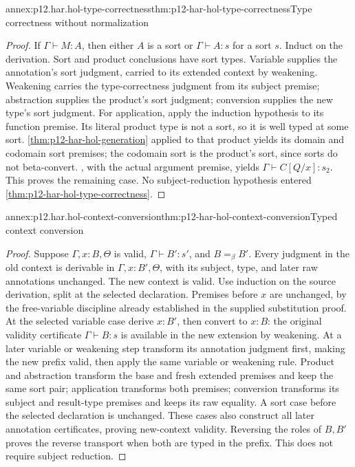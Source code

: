\begin{annexitem}{annex:p12.har.hol-type-correctness}{thm:p12-har-hol-type-correctness}{Type correctness without normalization}
\begin{proof}
If \(\Gamma\vdash M:A\), then either \(A\) is a sort or
\(\Gamma\vdash A:s\) for a sort \(s\).
Induct on the derivation. Sort and product conclusions have sort types.
Variable supplies the annotation's sort judgment, carried to its
extended context by weakening. Weakening carries the type-correctness
judgment from its subject premise; abstraction supplies the product's
sort judgment; conversion supplies the new type's sort judgment.
For application, apply the induction hypothesis to its function premise.
Its literal product type is not a sort, so it is well typed at some sort.
\cref{thm:p12-har-hol-generation} applied to that product yields its domain and codomain sort premises;
the codomain sort is the product's sort, since sorts do not beta-convert.
, with the actual argument
premise, yields \(\Gamma\vdash C[Q/x]:s_2\). This proves the remaining
case. No subject-reduction hypothesis entered \cref{thm:p12-har-hol-type-correctness}.
\end{proof}
\end{annexitem}

\begin{annexitem}{annex:p12.har.hol-context-conversion}{thm:p12-har-hol-context-conversion}{Typed context conversion}
\begin{proof}
Suppose \(\Gamma,x:B,\Theta\) is valid,
\(\Gamma\vdash B':s'\), and \(B=_\beta B'\).
Every judgment in the old context is derivable in
\(\Gamma,x:B',\Theta\), with its subject, type, and later raw
annotations unchanged. The new context is valid.
Use induction on the source derivation, split at the selected declaration.
Premises before \(x\) are unchanged, by the free-variable discipline
already established in the supplied substitution proof. At the selected
variable case derive \(x:B'\), then convert to \(x:B\): the original
validity certificate \(\Gamma\vdash B:s\) is available in the new
extension by weakening. At a later variable or weakening step transform
its annotation judgment first, making the new prefix valid, then apply
the same variable or weakening rule. Product and abstraction transform
the base and fresh extended premises and keep the same sort pair;
application transforms both premises; conversion transforms its subject
and result-type premises and keeps its raw equality. A sort case before
the selected declaration is unchanged. These cases also construct all
later annotation certificates, proving new-context validity. Reversing
the roles of \(B,B'\) proves the reverse transport when both are typed
in the prefix. This does not require subject reduction.
\end{proof}
\end{annexitem}

